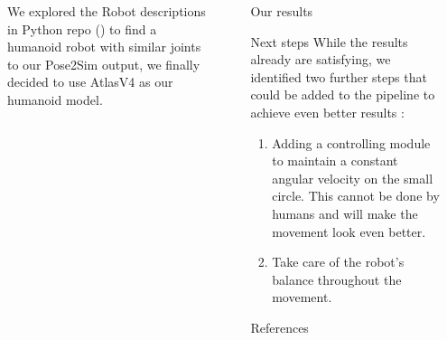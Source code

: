 \documentclass[final]{beamer}
\newlength{\sepwidth}
\newlength{\colwidth}
\newcommand{\separatorcolumn}{\begin{column}{\sepwidth}\end{column}}
\begin{document}
\begin{frame}[t]
\begin{columns}[t]
\begin{column}{\colwidth}
We explored the Robot descriptions in Python repo (\cite{robot_descriptions_py}) to find a humanoid robot with similar joints to our Pose2Sim output, we finally decided to use AtlasV4 as our humanoid model.
  \end{column}
\separatorcolumn
\begin{column}{\colwidth}
  
  \begin{alertblock}{Our results}
  \end{alertblock}

  \begin{block}{Next steps}
While the results already are satisfying, we identified two further steps that could be added to the pipeline to achieve even better results :
\begin{enumerate}
    \item Adding a controlling module to maintain a constant angular velocity on the small circle. This cannot be done by humans and will make the movement look even better.
    \item Take care of the robot's balance throughout the movement.
\end{enumerate}
  \end{block}
  \begin{block}{References}
 \footnotesize{\printbibliography}
 
  \end{block}
\end{column}
\separatorcolumn
\end{columns}
\end{frame}
\end{document}

